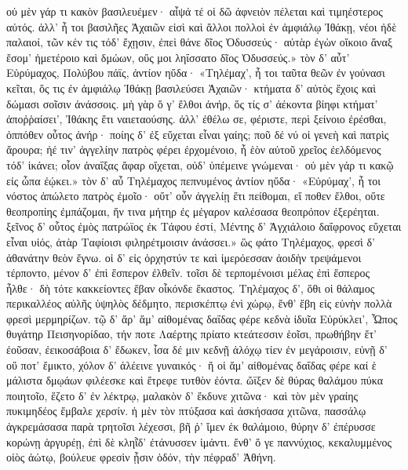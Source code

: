 οὐ μὲν γάρ τι κακὸν βασιλευέμεν· αἶψά τέ οἱ δῶ
ἀφνειὸν πέλεται καὶ τιμηέστερος αὐτός.
ἀλλ' ἦ τοι βασιλῆες Ἀχαιῶν εἰσὶ καὶ ἄλλοι
πολλοὶ ἐν ἀμφιάλῳ Ἰθάκῃ, νέοι ἠδὲ παλαιοί,
τῶν κέν τις τόδ' ἔχῃσιν, ἐπεὶ θάνε δῖος Ὀδυσσεύς·
αὐτὰρ ἐγὼν οἴκοιο ἄναξ ἔσομ' ἡμετέροιο
καὶ δμώων, οὕς μοι ληΐσσατο δῖος Ὀδυσσεύς.»
\nstanza
τὸν δ' αὖτ' Εὐρύμαχος, Πολύβου πάϊς, ἀντίον ηὔδα·
«Τηλέμαχ', ἦ τοι ταῦτα θεῶν ἐν γούνασι κεῖται,    
ὅς τις ἐν ἀμφιάλῳ Ἰθάκῃ βασιλεύσει Ἀχαιῶν·
κτήματα δ' αὐτὸς ἔχοις καὶ δώμασι σοῖσιν ἀνάσσοις.
μὴ γὰρ ὅ γ' ἔλθοι ἀνήρ, ὅς τίς σ' ἀέκοντα βίηφι
κτήματ' ἀποῤῥαίσει', Ἰθάκης ἔτι ναιεταούσης.
\nstanza
ἀλλ' ἐθέλω σε, φέριστε, περὶ ξείνοιο ἐρέσθαι,
ὁππόθεν οὗτος ἀνήρ· ποίης δ' ἐξ εὔχεται εἶναι
γαίης; ποῦ δέ νύ οἱ γενεὴ καὶ πατρὶς ἄρουρα;
ἠέ τιν' ἀγγελίην πατρὸς φέρει ἐρχομένοιο,
ἦ ἑὸν αὐτοῦ χρεῖος ἐελδόμενος τόδ' ἱκάνει;
οἷον ἀναΐξας ἄφαρ οἴχεται, οὐδ' ὑπέμεινε    
γνώμεναι· οὐ μὲν γάρ τι κακῷ εἰς ὦπα ἐῴκει.»
\nstanza
τὸν δ' αὖ Τηλέμαχος πεπνυμένος ἀντίον ηὔδα·
«Εὐρύμαχ', ἦ τοι νόστος ἀπώλετο πατρὸς ἐμοῖο·
οὔτ' οὖν ἀγγελίῃ ἔτι πείθομαι, εἴ ποθεν ἔλθοι,
οὔτε θεοπροπίης ἐμπάζομαι, ἥν τινα μήτηρ
ἐς μέγαρον καλέσασα θεοπρόπον ἐξερέηται.
ξεῖνος δ' οὗτος ἐμὸς πατρώϊος ἐκ Τάφου ἐστί,
Μέντης δ' Ἀγχιάλοιο δαΐφρονος εὔχεται εἶναι
υἱός, ἀτὰρ Ταφίοισι φιληρέτμοισιν ἀνάσσει.»
\nstanza
ὣς φάτο Τηλέμαχος, φρεσὶ δ' ἀθανάτην θεὸν ἔγνω.    
οἱ δ' εἰς ὀρχηστύν τε καὶ ἱμερόεσσαν ἀοιδὴν
τρεψάμενοι τέρποντο, μένον δ' ἐπὶ ἕσπερον ἐλθεῖν.
τοῖσι δὲ τερπομένοισι μέλας ἐπὶ ἕσπερος ἦλθε·
δὴ τότε κακκείοντες ἔβαν οἶκόνδε ἕκαστος.
Τηλέμαχος δ', ὅθι οἱ θάλαμος περικαλλέος αὐλῆς
ὑψηλὸς δέδμητο, περισκέπτῳ ἐνὶ χώρῳ,
ἔνθ' ἔβη εἰς εὐνὴν πολλὰ φρεσὶ μερμηρίζων.
τῷ δ' ἄρ' ἅμ' αἰθομένας δαΐδας φέρε κεδνὰ ἰδυῖα
Εὐρύκλει', Ὦπος θυγάτηρ Πεισηνορίδαο,
τήν ποτε Λαέρτης πρίατο κτεάτεσσιν ἑοῖσι,    
πρωθήβην ἔτ' ἐοῦσαν, ἐεικοσάβοια δ' ἔδωκεν,
ἶσα δέ μιν κεδνῇ ἀλόχῳ τίεν ἐν μεγάροισιν,
εὐνῇ δ' οὔ ποτ' ἔμικτο, χόλον δ' ἀλέεινε γυναικός·
ἥ οἱ ἅμ' αἰθομένας δαΐδας φέρε καί ἑ μάλιστα
δμῳάων φιλέεσκε καὶ ἔτρεφε τυτθὸν ἐόντα.
ὤϊξεν δὲ θύρας θαλάμου πύκα ποιητοῖο,
ἕζετο δ' ἐν λέκτρῳ, μαλακὸν δ' ἔκδυνε χιτῶνα·
καὶ τὸν μὲν γραίης πυκιμηδέος ἔμβαλε χερσίν.
ἡ μὲν τὸν πτύξασα καὶ ἀσκήσασα χιτῶνα,
πασσάλῳ ἀγκρεμάσασα παρὰ τρητοῖσι λέχεσσι,    
βῆ ῥ' ἴμεν ἐκ θαλάμοιο, θύρην δ' ἐπέρυσσε κορώνῃ
ἀργυρέῃ, ἐπὶ δὲ κληῗδ' ἐτάνυσσεν ἱμάντι.
ἔνθ' ὅ γε παννύχιος, κεκαλυμμένος οἰὸς ἀώτῳ,
βούλευε φρεσὶν ᾗσιν ὁδόν, τὴν πέφραδ' Ἀθήνη.
\egroup
\bye